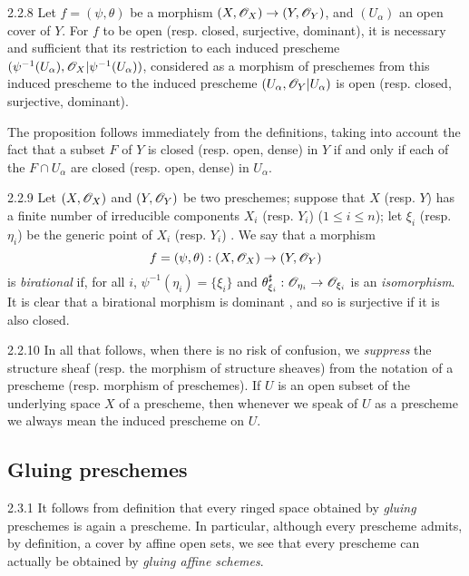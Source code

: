 \begin{envs}[Proposition]{2.2.8}
\label{prop-1.2.2.8}
Let $f=(\psi,\theta)$ be a morphism
$(X,\mathscr{O}_X)\to(Y,\mathscr{O}_Y)$, and $(U_\alpha)$ an open cover of $Y$. For $f$ to be
open (resp. closed, surjective, dominant), it is necessary and sufficient that
its restriction to each induced prescheme
$(\psi^{-1}(U_\alpha),\mathscr{O}_X|\psi^{-1}(U_\alpha))$, considered as a morphism of
preschemes from this induced prescheme to the induced prescheme
$(U_\alpha,\mathscr{O}_Y|U_\alpha)$ is open (resp. closed, surjective, dominant).
\end{envs}

The proposition follows immediately from the definitions, taking into
account the fact that a subset $F$ of $Y$ is closed (resp. open, dense) in $Y$
if and only if each of the $F\cap U_\alpha$ are closed (resp. open, dense) in
$U_\alpha$.

\begin{env}{2.2.9}
\label{env-1.2.2.9}
Let $(X,\mathscr{O}_X)$ and $(Y,\mathscr{O}_Y)$ be two preschemes; suppose that
$X$ (resp. $Y$) has a finite number of irreducible components $X_i$ (resp.
$Y_i$) ($1\leqslant i\leqslant n$); let $\xi_i$ (resp. $\eta_i$) be the generic
point of $X_i$ (resp. $Y_i$) . We say that a morphism
\[
  f=(\psi,\theta):(X,\mathscr{O}_X)\to(Y,\mathscr{O}_Y)
\]
is \emph{birational} if, for all $i$, $\psi^{-1}(\eta_i)=\{\xi_i\}$ and
$\theta_{\xi_i}^\sharp:\mathscr{O}_{\eta_i}\to\mathscr{O}_{\xi_i}$ is an \emph{isomorphism}. It
is clear that a birational morphism is dominant , and so is
surjective if it is also closed.
\end{env}

\begin{env}{2.2.10}
\label{rmk-1.2.2.10}
In all that follows, when there is
no risk of confusion, we \emph{suppress} the structure sheaf (resp. the morphism
of structure sheaves) from the notation of a prescheme (resp. morphism of
preschemes). If $U$ is an open subset of the underlying space $X$ of a
prescheme, then whenever we speak of $U$ as a prescheme we always mean the
induced prescheme on $U$.
\end{env}

\subsection{Gluing preschemes}
\label{1-schemes-2.3}

\begin{env}{2.3.1}
\label{env-1.2.3.1}
It follows from definition  that every ringed space obtained by
\emph{gluing} preschemes  is again a prescheme. In particular, although
every prescheme admits, by definition, a cover by affine open sets, we see that every
prescheme can actually be obtained by \emph{gluing affine schemes}.
\end{env}

